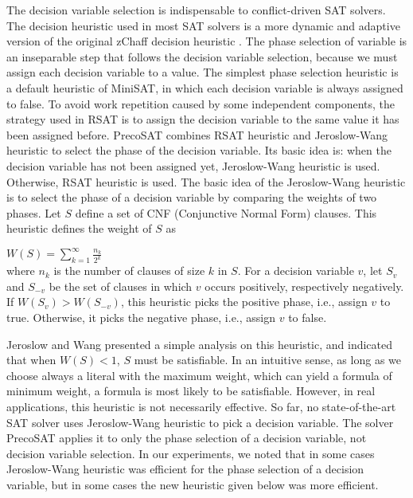 \documentclass{llncs}
\begin{document}
The decision variable selection is indispensable to conflict-driven
SAT solvers. The decision heuristic used in most SAT solvers is a
more dynamic and adaptive version of the original zChaff decision
heuristic \cite {CDCL:16}. The phase selection of variable is an
inseparable step that follows the decision variable selection,
because we must assign each decision variable to a value. The
simplest phase selection heuristic is a default heuristic of
MiniSAT, in which each decision variable is always assigned to
false. To avoid work repetition caused by some independent
components, the strategy used in RSAT \cite{RsatHeuris:1,Rsat:6} is
to assign the decision variable to the same value it has been
assigned before. PrecoSAT \cite{Precosat10:5} combines RSAT
heuristic \cite{RsatHeuris:1} and Jeroslow-Wang heuristic
\cite{JWheuris:2} to select the phase of the decision variable. Its
basic idea is: when the decision variable has not been assigned yet,
Jeroslow-Wang heuristic is used. Otherwise, RSAT heuristic is used.
The basic idea of the Jeroslow-Wang heuristic is to select the phase
of a decision variable by comparing the weights of two phases. Let
$S$ define a set of CNF (Conjunctive Normal Form) clauses. This
heuristic defines the weight of $S$ as

\hskip 10mm $ W(S) = \sum\limits_{k=1}^{\infty}
\displaystyle {\frac{n_k}{2^k}} $ \\
where $n_k$ is the number of clauses of size $k$ in $S$. For a
decision variable $v$, let $S_v$ and $S_{-v}$ be the set of clauses
in which $v$ occurs positively, respectively negatively. If $W(S_v)>
W(S_{-v})$, this heuristic picks the positive phase, i.e., assign
$v$ to true. Otherwise, it picks the negative phase, i.e., assign
$v$ to false.

Jeroslow and Wang \cite{JWheuris:2} presented a simple analysis on
this heuristic, and indicated that when $W(S) < 1$, $S$ must be
satisfiable. In an intuitive sense, as long as we choose always a
literal with the maximum weight, which can yield a formula of
minimum weight, a formula is most likely to be satisfiable. However,
in real applications, this heuristic is not necessarily effective.
So far, no state-of-the-art SAT solver uses Jeroslow-Wang heuristic
to pick a decision variable. The solver PrecoSAT applies it to only
the phase selection of a decision variable, not decision variable
selection. In our experiments, we noted that in some cases
Jeroslow-Wang heuristic was efficient for the phase selection of a
decision variable, but in some cases the new heuristic given below
was more efficient.
\end{document}
